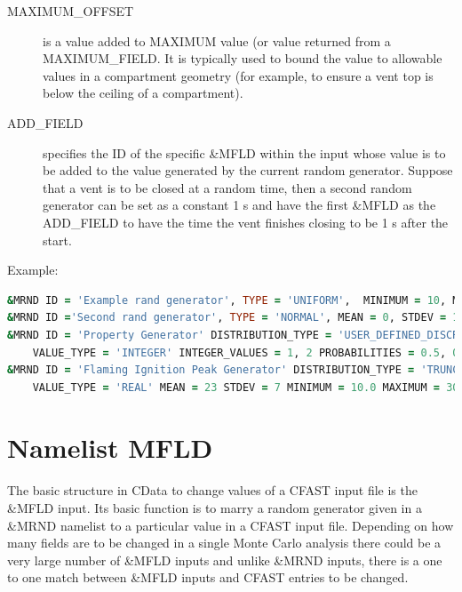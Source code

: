 \documentclass[12pt,twoside]{book}
\begin{document}
\begin{description}
  \item[MAXIMUM\_OFFSET] is a value added to {\ct MAXIMUM} value (or value returned from a {\ct MAXIMUM\_FIELD}. It is typically used to bound the value to allowable values in a compartment geometry (for example, to ensure a vent top is below the ceiling of a compartment).
  \item[ADD\_FIELD] specifies the  ID of the specific \&MFLD  within the input whose value is to be added to the value generated by the current random generator. Suppose that a vent is to be closed at a random time, then a second random generator can be set as a constant 1 s and have the first \&MFLD as the ADD\_FIELD  to have the time the vent finishes closing to be 1 s after the start.
\end{description}

\vspace{\baselineskip}
\noindent Example:
\begin{lstlisting}[language=Fortran, basicstyle=\scriptsize]
&MRND ID = 'Example rand generator', TYPE = 'UNIFORM',  MINIMUM = 10, MAXIMUM = 50 /
&MRND ID ='Second rand generator', TYPE = 'NORMAL', MEAN = 0, STDEV = 1 /
&MRND ID = 'Property Generator' DISTRIBUTION_TYPE = 'USER_DEFINED_DISCRETE'
    VALUE_TYPE = 'INTEGER' INTEGER_VALUES = 1, 2 PROBABILITIES = 0.5, 0.5/
&MRND ID = 'Flaming Ignition Peak Generator' DISTRIBUTION_TYPE = 'TRUNCATED_NORMAL'
    VALUE_TYPE = 'REAL' MEAN = 23 STDEV = 7 MINIMUM = 10.0 MAXIMUM = 30.0/
\end{lstlisting}

\section{Namelist MFLD}
\label{info:MFLD}

The basic structure in CData to change values of a CFAST input file is the { \ct \&MFLD} input. Its basic function is to marry a random generator given in a { \ct \&MRND} namelist to a particular value in a CFAST input file. Depending on how many fields are to be changed in a single Monte Carlo analysis there could be a very large number of { \ct \&MFLD} inputs and unlike { \ct \&MRND } inputs, there is a one to one match between { \ct \&MFLD} inputs and CFAST entries to be changed.
\end{document}

